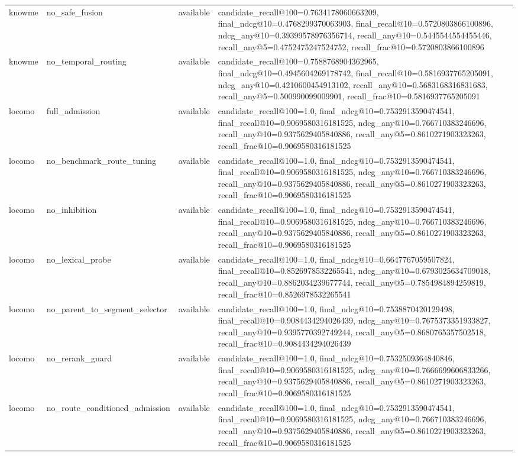 \begin{tabular}{llll}
knowme & no_safe_fusion & available & candidate_recall@100=0.7634178060663209, final_ndcg@10=0.4768299370063903, final_recall@10=0.5720803866100896, ndcg_any@10=0.39399578976356714, recall_any@10=0.5445544554455446, recall_any@5=0.4752475247524752, recall_frac@10=0.5720803866100896 \\
knowme & no_temporal_routing & available & candidate_recall@100=0.7588768904362965, final_ndcg@10=0.4945604269178742, final_recall@10=0.5816937765205091, ndcg_any@10=0.4210600454913102, recall_any@10=0.5683168316831683, recall_any@5=0.500990099009901, recall_frac@10=0.5816937765205091 \\
locomo & full_admission & available & candidate_recall@100=1.0, final_ndcg@10=0.7532913590474541, final_recall@10=0.9069580316181525, ndcg_any@10=0.766710383246696, recall_any@10=0.9375629405840886, recall_any@5=0.8610271903323263, recall_frac@10=0.9069580316181525 \\
locomo & no_benchmark_route_tuning & available & candidate_recall@100=1.0, final_ndcg@10=0.7532913590474541, final_recall@10=0.9069580316181525, ndcg_any@10=0.766710383246696, recall_any@10=0.9375629405840886, recall_any@5=0.8610271903323263, recall_frac@10=0.9069580316181525 \\
locomo & no_inhibition & available & candidate_recall@100=1.0, final_ndcg@10=0.7532913590474541, final_recall@10=0.9069580316181525, ndcg_any@10=0.766710383246696, recall_any@10=0.9375629405840886, recall_any@5=0.8610271903323263, recall_frac@10=0.9069580316181525 \\
locomo & no_lexical_probe & available & candidate_recall@100=1.0, final_ndcg@10=0.6647767059507824, final_recall@10=0.8526978532265541, ndcg_any@10=0.6793025634709018, recall_any@10=0.8862034239677744, recall_any@5=0.7854984894259819, recall_frac@10=0.8526978532265541 \\
locomo & no_parent_to_segment_selector & available & candidate_recall@100=1.0, final_ndcg@10=0.7538870420129498, final_recall@10=0.9084434294026439, ndcg_any@10=0.7675373351933827, recall_any@10=0.9395770392749244, recall_any@5=0.8680765357502518, recall_frac@10=0.9084434294026439 \\
locomo & no_rerank_guard & available & candidate_recall@100=1.0, final_ndcg@10=0.7532509364840846, final_recall@10=0.9069580316181525, ndcg_any@10=0.7666699606833266, recall_any@10=0.9375629405840886, recall_any@5=0.8610271903323263, recall_frac@10=0.9069580316181525 \\
locomo & no_route_conditioned_admission & available & candidate_recall@100=1.0, final_ndcg@10=0.7532913590474541, final_recall@10=0.9069580316181525, ndcg_any@10=0.766710383246696, recall_any@10=0.9375629405840886, recall_any@5=0.8610271903323263, recall_frac@10=0.9069580316181525 \\

\end{tabular}
